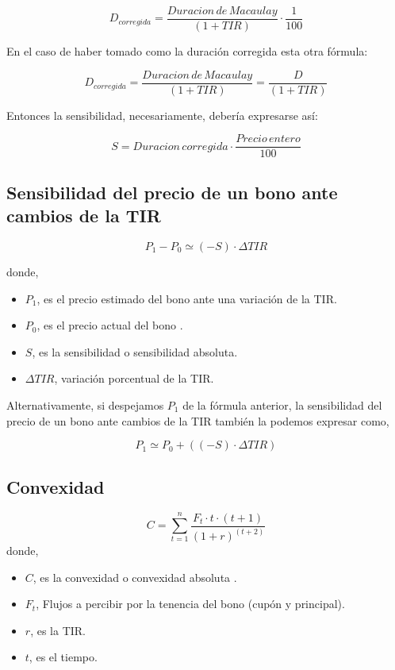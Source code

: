 \documentclass[
  letterpaper,
  DIV=11,
  numbers=noendperiod]{scrreprt}
\begin{document}
\begin{tcolorbox}
\[D_{corregida}=\frac{Duracion\,de\, Macaulay}{\left(1+TIR\right)}\cdot\frac{1}{100}\]

En el caso de haber tomado como la duración corregida esta otra fórmula:

\[D_{corregida}=\frac{Duracion\,de\, Macaulay}{\left(1+TIR\right)}=\frac{D}{\left(1+TIR\right)} \]

Entonces la sensibilidad, necesariamente, debería expresarse así:

\[S= Duracion\,corregida \cdot \frac{Precio\,entero}{100}\]

\subsection*{Sensibilidad del precio de un bono ante cambios de la
TIR}\label{sensibilidad-del-precio-de-un-bono-ante-cambios-de-la-tir}

\[P_1-P_0\simeq (-S)\cdot\Delta TIR\]

donde,

\begin{itemize}
\item
  \(P_1\), es el precio estimado del bono ante una variación de la TIR.
\item
  \(P_0\), es el precio actual del bono .
\item
  \(S\), es la sensibilidad o sensibilidad absoluta.
\item
  \(\Delta TIR\), variación porcentual de la TIR.
\end{itemize}

Alternativamente, si despejamos \(P_1\) de la fórmula anterior, la
sensibilidad del precio de un bono ante cambios de la TIR también la
podemos expresar como,

\[P_1\simeq P_0 + ((-S)\cdot\Delta TIR)\]

\subsection*{Convexidad}\label{convexidad}

\[C=\sum_{t=1}^n\frac{F_t\cdot t\cdot\left(t+1\right)}{\left(1+r\right)^{\left(t+2\right)}}\]
donde,

\begin{itemize}
\item
  \(C\), es la convexidad o convexidad absoluta .
\item
  \(F_t\), Flujos a percibir por la tenencia del bono (cupón y
  principal).
\item
  \(r\), es la TIR.
\item
  \(t\), es el tiempo.
\end{itemize}


\end{tcolorbox}
\end{document}
